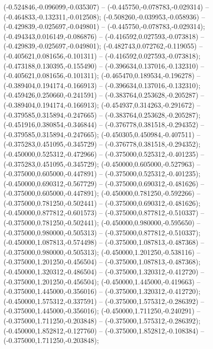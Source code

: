  (-0.524846,-0.096099,-0.035307) -- (-0.445750,-0.078783,-0.029314) -- (-0.464833,-0.132311,-0.012508);
 (-0.508260,-0.039953,-0.058936) -- (-0.429839,-0.025697,-0.049801) -- (-0.445750,-0.078783,-0.029314);
 (-0.494343,0.016149,-0.086876) -- (-0.416592,0.027593,-0.073818) -- (-0.429839,-0.025697,-0.049801);
 (-0.482743,0.072762,-0.119055) -- (-0.405621,0.081656,-0.101311) -- (-0.416592,0.027593,-0.073818);
 (-0.473188,0.130395,-0.155490) -- (-0.396634,0.137016,-0.132310) -- (-0.405621,0.081656,-0.101311);
 (-0.465470,0.189534,-0.196278) -- (-0.389404,0.194174,-0.166913) -- (-0.396634,0.137016,-0.132310);
 (-0.459426,0.250660,-0.241591) -- (-0.383764,0.253628,-0.205287) -- (-0.389404,0.194174,-0.166913);
 (-0.454937,0.314263,-0.291672) -- (-0.379585,0.315894,-0.247665) -- (-0.383764,0.253628,-0.205287);
 (-0.451916,0.380854,-0.346844) -- (-0.376778,0.381518,-0.294352) -- (-0.379585,0.315894,-0.247665);
 (-0.450305,0.450984,-0.407511) -- (-0.375283,0.451095,-0.345729) -- (-0.376778,0.381518,-0.294352);
 (-0.450000,0.525312,-0.472966) -- (-0.375000,0.525312,-0.401235) -- (-0.375283,0.451095,-0.345729);
 (-0.450000,0.605000,-0.527963) -- (-0.375000,0.605000,-0.447891) -- (-0.375000,0.525312,-0.401235);
 (-0.450000,0.690312,-0.567729) -- (-0.375000,0.690312,-0.481626) -- (-0.375000,0.605000,-0.447891);
 (-0.450000,0.781250,-0.592266) -- (-0.375000,0.781250,-0.502441) -- (-0.375000,0.690312,-0.481626);
 (-0.450000,0.877812,-0.601573) -- (-0.375000,0.877812,-0.510337) -- (-0.375000,0.781250,-0.502441);
 (-0.450000,0.980000,-0.595650) -- (-0.375000,0.980000,-0.505313) -- (-0.375000,0.877812,-0.510337);
 (-0.450000,1.087813,-0.574498) -- (-0.375000,1.087813,-0.487368) -- (-0.375000,0.980000,-0.505313);
 (-0.450000,1.201250,-0.538116) -- (-0.375000,1.201250,-0.456504) -- (-0.375000,1.087813,-0.487368);
 (-0.450000,1.320312,-0.486504) -- (-0.375000,1.320312,-0.412720) -- (-0.375000,1.201250,-0.456504);
 (-0.450000,1.445000,-0.419663) -- (-0.375000,1.445000,-0.356016) -- (-0.375000,1.320312,-0.412720);
 (-0.450000,1.575312,-0.337591) -- (-0.375000,1.575312,-0.286392) -- (-0.375000,1.445000,-0.356016);
 (-0.450000,1.711250,-0.240291) -- (-0.375000,1.711250,-0.203848) -- (-0.375000,1.575312,-0.286392);
 (-0.450000,1.852812,-0.127760) -- (-0.375000,1.852812,-0.108384) -- (-0.375000,1.711250,-0.203848);
